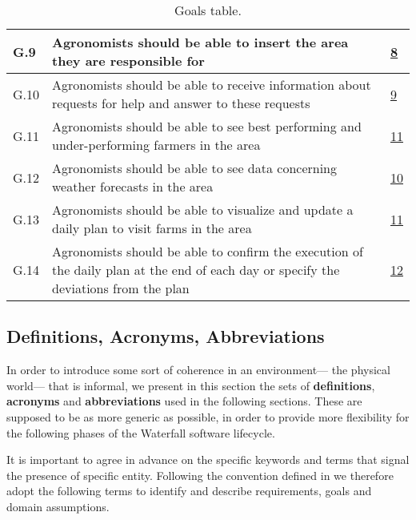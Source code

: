 \begin{table}[H]
\begin{tabular}{|l|m{}|l|}
        G.9                                  &   Agronomists should be able to insert the area they are responsible for   &   \hyperref[line:agronomistPrivileges]{8} \\
        \hline
        G.10                                                      &  Agronomists should be able to receive information about requests for help and answer to these requests   &    \hyperref[line:agronomistPrivileges]{9}\\%
        \hline
        G.11                                               &     Agronomists should be able to see best performing and under-performing farmers in the area &   \hyperref[line:agronomistPrivileges]{11} \\
        \hline
        G.12                                              &   Agronomists should be able to see data concerning weather forecasts in the area     &   \hyperref[line:agronomistPrivileges]{10} \\
        \hline
        G.13                                               &     Agronomists should be able to visualize and update a daily plan to visit farms in the area &   \hyperref[line:agronomistPrivileges]{11} \\
        \hline
        G.14                                              &   Agronomists should be able to confirm the execution of the daily plan at the end of each day or specify the deviations from the plan     &   \hyperref[line:agronomistPrivileges]{12} \\
        \hline
    \end{tabular}
    
    \caption{\label{tab:goals}Goals table.}
\end{table}

\newpage
\subsection{Definitions, Acronyms, Abbreviations}
In order to introduce some sort of coherence in an environment--- the physical world--- that is informal, we present in this section the sets of \textbf{definitions}, \textbf{acronyms} and \textbf{abbreviations} used in the following sections. These are supposed to be as more generic as possible, in order to provide more flexibility for the following phases of the Waterfall software lifecycle.

It is important to agree in advance on the specific keywords and terms that signal the presence of specific entity. Following the convention defined in \cite{iso_ieee_standard} we therefore adopt the following terms to identify and describe requirements, goals and domain assumptions.

